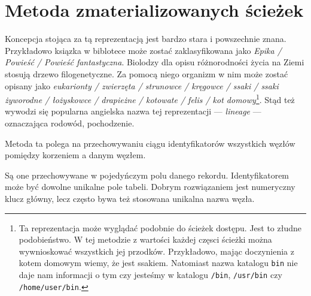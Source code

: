 \section{Metoda zmaterializowanych ścieżek}


Koncepcja stojąca za tą reprezentacją jest bardzo stara i powszechnie znana.
Przykładowo ksiązka w biblotece może zostać zaklasyfikowana jako \textit{Epika / Powieść / Powieść fantastyczna}.
Biolodzy dla opisu różnorodności życia na Ziemi stosują drzewo filogenetyczne.
Za pomocą niego organizm w nim może zostać opisany jako
\textit{eukarionty / zwierzęta / strunowce / kręgowce / ssaki / ssaki żyworodne / łożyskowce / drapieżne / kotowate / felis / kot domowy}\footnote{
    Ta reprezentacja może wyglądać podobnie do ścieżek dostępu.
    Jest to złudne podobieństwo.
    W tej metodzie z wartości każdej częsci ścieżki można wywnioskować wszystkich jej przodków.
    Przykładowo, mając doczynienia z kotem domowym wiemy, że jest ssakiem.
    Natomiast nazwa katalogu \texttt{bin} nie daje nam informacji o tym czy jesteśmy w katalogu \texttt{/bin}, \texttt{/usr/bin} czy \texttt{/home/user/bin}.
}.
Stąd też wywodzi się popularna angielska nazwa tej reprezentacji --- \textit{lineage} --- oznaczająca rodowód, pochodzenie.





Metoda ta polega na przechowywaniu ciągu identyfikatorów wszystkich węzłów pomiędzy korzeniem a danym węzłem.

Są one przechowywane w pojedyńczym polu danego rekordu.
Identyfikatorem może być dowolne unikalne pole  tabeli.
Dobrym rozwiązaniem jest numeryczny klucz główny, lecz często bywa też stosowana unikalna nazwa węzła.



